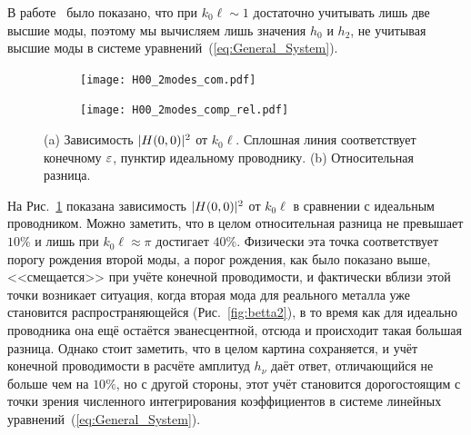 В работе~\cite{Shapiro16} было показано, что при 
$k_0 \ell \sim 1$ достаточно учитывать лишь две высшие моды, поэтому мы вычисляем лишь значения $h_0$ и $h_2$, не учитывая высшие моды в системе уравнений~(\ref{eq:General_System}).
\begin{figure}
  \begin{subfigure}[t]{1\textwidth}
    \texttt{[image: H00\_2modes\_com.pdf]}
    \caption{}
  \end{subfigure}
  
  \begin{subfigure}[t]{1\textwidth}
    \texttt{[image: H00\_2modes\_comp\_rel.pdf]}
    \caption{}
  \end{subfigure}
  \caption{(a) Зависимость $\lvert H(0,0)\rvert^2$ от $k_0 \ell$. Сплошная линия соответствует конечному $\varepsilon$, пунктир идеальному проводнику. (b) Относительная разница.}	\label{pic:comp}
\end{figure}
На Рис.~\ref{pic:comp} показана зависимость $\lvert H(0,0)\rvert^2$ от $k_0 \ell$ в сравнении с идеальным проводником. Можно заметить, что в целом 
относительная разница не превышает  $10\%$ и лишь при  $k_0 \ell \approx \pi$ достигает $40\%$. Физически эта точка 
соответствует порогу рождения второй моды, а порог рождения, как было показано выше, <<смещается>> при учёте конечной проводимости, и фактически
вблизи этой точки возникает ситуация, когда вторая мода для реального металла уже становится распространяющейся (Рис.~\ref{fig:betta2}), 
в то время как для идеально проводника
она ещё остаётся эванесцентной, отсюда и происходит такая большая разница. Однако стоит заметить, что в целом картина сохраняется,
и учёт конечной проводимости в расчёте амплитуд $h_\nu$ даёт ответ, отличающийся не больше чем на $10\%$, но с другой стороны, этот учёт 
становится дорогостоящим с точки зрения численного интегрирования  коэффициентов в системе линейных уравнений~(\ref{eq:General_System}).

